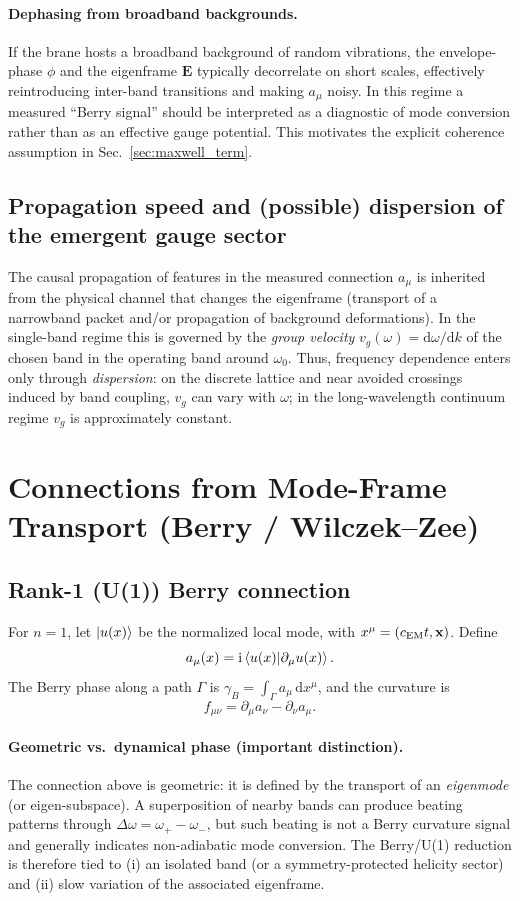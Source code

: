 \documentclass[11pt,a4paper]{article}
\providecommand{\dd}{\mathrm{d}}
\providecommand{\ii}{\mathrm{i}}
\newcommand{\x}{\mathbf{x}}                 %
\begin{document}
\paragraph{Dephasing from broadband backgrounds.}
If the brane hosts a broadband background of random vibrations, the envelope-phase $\phi$ and the eigenframe $\mathbf{E}$
typically decorrelate on short scales, effectively reintroducing inter-band transitions and making $a_\mu$ noisy.
In this regime a measured ``Berry signal'' should be interpreted as a diagnostic of mode conversion rather than as an
effective gauge potential. This motivates the explicit coherence assumption in Sec.~\ref{sec:maxwell_term}.


\subsection{Propagation speed and (possible) dispersion of the emergent gauge sector}
The causal propagation of features in the measured connection $a_\mu$ is inherited from the physical channel that changes the
eigenframe (transport of a narrowband packet and/or propagation of background deformations). In the single-band regime this
is governed by the \emph{group velocity} $v_g(\omega)=\dd\omega/\dd k$ of the chosen band in the operating band around $\omega_0$.
Thus, frequency dependence enters only through \emph{dispersion}: on the discrete lattice and near avoided crossings induced by
band coupling, $v_g$ can vary with $\omega$; in the long-wavelength continuum regime $v_g$ is approximately constant.


\section{Connections from Mode-Frame Transport (Berry / Wilczek--Zee)}
\label{sec:connections}

\subsection{Rank-1 (U(1)) Berry connection}
For \(n=1\), let \(\ket{u(x)}\) be the normalized local mode, with \(x^\mu=(c_{\rm EM}t,\x)\).
Define
\[
a_\mu(x) = \ii \braket{u(x)}{\partial_\mu u(x)}.
\]
The Berry phase along a path \(\Gamma\) is \(\gamma_B=\int_\Gamma a_\mu\,\dd x^\mu\),
and the curvature is
\[
f_{\mu\nu} = \partial_\mu a_\nu - \partial_\nu a_\mu.
\]


\paragraph{Geometric vs.\ dynamical phase (important distinction).}
The connection above is geometric: it is defined by the transport of an \emph{eigenmode} (or eigen-subspace).
A superposition of nearby bands can produce beating patterns through $\Delta\omega=\omega_+-\omega_-$, but such beating is not a
Berry curvature signal and generally indicates non-adiabatic mode conversion. The Berry/U(1) reduction is therefore tied to
(i) an isolated band (or a symmetry-protected helicity sector) and (ii) slow variation of the associated eigenframe.
\end{document}

